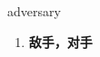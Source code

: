 
\begin{frame}
{\huge adversary}
\begin{center}
\begin{enumerate}\Large
  \item \textbf{敌手，对手}
\end{enumerate}
\end{center}
\end{frame}

